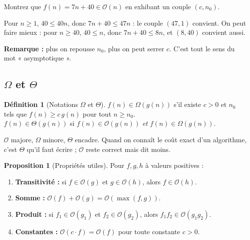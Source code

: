 \documentclass[11pt,a4paper]{article}
\newcommand{\bigO}{\mathcal{O}}
\newcommand{\bigOmega}{\Omega}
\newcommand{\bigTheta}{\Theta}
\theoremstyle{definition}
\newtheorem{definition}{Définition}[section]
\newtheorem{proposition}[theorem]{Proposition}
\theoremstyle{remark}
\begin{document}
\begin{appliboxQ}
Montrez que $f(n) = 7n + 40 \in \bigO(n)$ en exhibant un couple
$(c, n_0)$.
\end{appliboxQ}

\begin{appliboxR}[Réponse]
Pour $n \geq 1$, $40 \leq 40n$, donc $7n + 40 \leq 47n$ : le couple
$(47, 1)$ convient. On peut faire mieux : pour $n \geq 40$, $40 \leq n$,
donc $7n + 40 \leq 8n$, et $(8, 40)$ convient aussi.

\textbf{Remarque :} plus on repousse $n_0$, plus on peut serrer $c$. C'est
tout le sens du mot « asymptotique ».
\end{appliboxR}

\subsection{$\bigOmega$ et $\bigTheta$}

\begin{definition}[Notations $\bigOmega$ et $\bigTheta$]
$f(n) \in \bigOmega(g(n))$ s'il existe $c > 0$ et $n_0$ tels que
$f(n) \geq c\,g(n)$ pour tout $n \geq n_0$.\\
$f(n) \in \bigTheta(g(n))$ si $f(n) \in \bigO(g(n))$ \emph{et}
$f(n) \in \bigOmega(g(n))$.
\end{definition}

$\bigO$ majore, $\bigOmega$ minore, $\bigTheta$ encadre. Quand on connaît le
coût exact d'un algorithme, c'est $\bigTheta$ qu'il faut écrire ; $\bigO$
reste correct mais dit moins.

\begin{proposition}[Propriétés utiles]
Pour $f, g, h$ à valeurs positives :
\begin{enumerate}[nosep,label=(\roman*)]
    \item \textbf{Transitivité :} si $f \in \bigO(g)$ et $g \in \bigO(h)$,
          alors $f \in \bigO(h)$.
    \item \textbf{Somme :} $\bigO(f) + \bigO(g) = \bigO(\max(f, g))$.
    \item \textbf{Produit :} si $f_1 \in \bigO(g_1)$ et
          $f_2 \in \bigO(g_2)$, alors $f_1 f_2 \in \bigO(g_1 g_2)$.
    \item \textbf{Constantes :} $\bigO(c \cdot f) = \bigO(f)$ pour toute
          constante $c > 0$.
\end{enumerate}
\end{proposition}
\end{document}
